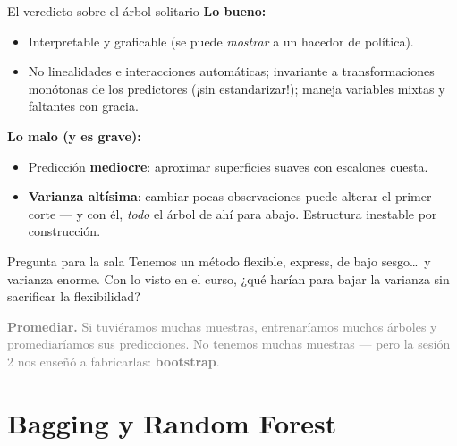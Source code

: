 \documentclass{beamer}
\newcommand{\1}{\mathbb{I}}
\begin{document}
\begin{frame}{El veredicto sobre el árbol solitario}
\small
\textbf{Lo bueno:}
\begin{itemize}\itemsep3pt
  \item Interpretable y graficable (se puede \emph{mostrar} a un hacedor de política).
  \item No linealidades e interacciones automáticas; invariante a transformaciones monótonas de los predictores (¡sin estandarizar!); maneja variables mixtas y faltantes con gracia.
\end{itemize}
\pause

\textbf{Lo malo (y es grave):}
\begin{itemize}\itemsep3pt
  \item Predicción \textbf{mediocre}: aproximar superficies suaves con escalones cuesta.
  \item \textbf{Varianza altísima}: cambiar pocas observaciones puede alterar el primer corte --- y con él, \emph{todo} el árbol de ahí para abajo. Estructura inestable por construcción.
\end{itemize}
\pause

\vspace{0.15cm}
\begin{block}{Pregunta para la sala}
Tenemos un método flexible, express, de bajo sesgo\ldots\ y varianza enorme. Con lo visto en el curso, ¿qué harían para bajar la varianza sin sacrificar la flexibilidad?
\end{block}
\pause
\textcolor{gray}{\textbf{Promediar.} Si tuviéramos muchas muestras, entrenaríamos muchos árboles y promediaríamos sus predicciones. No tenemos muchas muestras --- pero la sesión 2 nos enseñó a fabricarlas: \textbf{bootstrap}.}
\end{frame}


\section{Bagging y Random Forest}
\begin{frame}[noframenumbering]
\tableofcontents[currentsection]
\end{frame}
\end{document}
